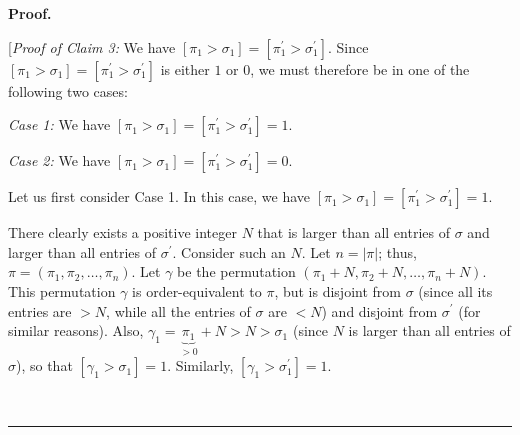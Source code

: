 \documentclass[numbers=enddot,12pt,final,onecolumn,notitlepage]{scrartcl}%
\theoremstyle{definition}
\newenvironment{statement}{\begin{quote}}{\end{quote}}
\newenvironment{proof}[1][Proof]{\noindent\textbf{#1.} }{\ \rule{0.5em}{0.5em}}
\begin{document}
\begin{proof}
\begin{statement}
\end{statement}

[\textit{Proof of Claim 3:} We have $\left[  \pi_{1}>\sigma_{1}\right]
=\left[  \pi_{1}^{\prime}>\sigma_{1}^{\prime}\right]  $. Since $\left[
\pi_{1}>\sigma_{1}\right]  =\left[  \pi_{1}^{\prime}>\sigma_{1}^{\prime
}\right]  $ is either $1$ or $0$, we must therefore be in one of the following
two cases:

\textit{Case 1:} We have $\left[  \pi_{1}>\sigma_{1}\right]  =\left[  \pi
_{1}^{\prime}>\sigma_{1}^{\prime}\right]  =1$.

\textit{Case 2:} We have $\left[  \pi_{1}>\sigma_{1}\right]  =\left[  \pi
_{1}^{\prime}>\sigma_{1}^{\prime}\right]  =0$.

Let us first consider Case 1. In this case, we have $\left[  \pi_{1}%
>\sigma_{1}\right]  =\left[  \pi_{1}^{\prime}>\sigma_{1}^{\prime}\right]  =1$.

There clearly exists a positive integer $N$ that is larger than all entries of
$\sigma$ and larger than all entries of $\sigma^{\prime}$. Consider such an
$N$. Let $n=\left\vert \pi\right\vert $; thus, $\pi=\left(  \pi_{1},\pi
_{2},\ldots,\pi_{n}\right)  $. Let $\gamma$ be the permutation $\left(
\pi_{1}+N,\pi_{2}+N,\ldots,\pi_{n}+N\right)  $. This permutation $\gamma$ is
order-equivalent to $\pi$, but is disjoint from $\sigma$ (since all its
entries are $>N$, while all the entries of $\sigma$ are $<N$) and disjoint
from $\sigma^{\prime}$ (for similar reasons). Also, $\gamma_{1}%
=\underbrace{\pi_{1}}_{>0}+N>N>\sigma_{1}$ (since $N$ is larger than all
entries of $\sigma$), so that $\left[  \gamma_{1}%
>\sigma_{1}\right]  =1$. Similarly, $\left[  \gamma_{1}>\sigma_{1}^{\prime
}\right]  =1$.


\end{proof}
\end{document}

